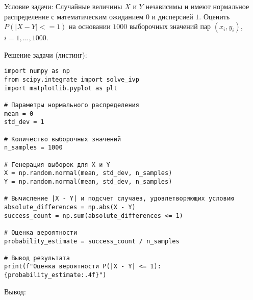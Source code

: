 Условие задачи: Случайные величины $X$ и $Y$ независимы и имеют нормальное распределение с математическим ожиданием $0$ и дисперсией $1$. Оценить $P(|X-Y|<=1)$ на основании $1000$ выборочных значений пар $(x_{i}, y_{i})$, $i=1,...,1000$.

Решение задачи (листинг):

\begin{verbatim}
import numpy as np
from scipy.integrate import solve_ivp
import matplotlib.pyplot as plt

# Параметры нормального распределения
mean = 0
std_dev = 1

# Количество выборочных значений
n_samples = 1000

# Генерация выборок для X и Y
X = np.random.normal(mean, std_dev, n_samples)
Y = np.random.normal(mean, std_dev, n_samples)

# Вычисление |X - Y| и подсчет случаев, удовлетворяющих условию
absolute_differences = np.abs(X - Y)
success_count = np.sum(absolute_differences <= 1)

# Оценка вероятности
probability_estimate = success_count / n_samples

# Вывод результата
print(f"Оценка вероятности P(|X - Y| <= 1): {probability_estimate:.4f}")
\end{verbatim}

Вывод:
